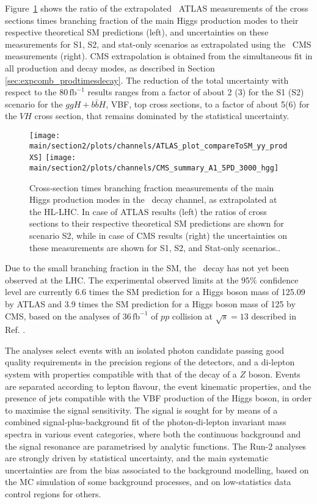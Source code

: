 Figure~\ref{fig:Hyy_ATLAS_HLLHC_S2} shows the ratio of the extrapolated \Hyy\ ATLAS measurements of the cross sections times branching fraction of the main Higgs production modes to their respective theoretical SM predictions (left), and uncertainties on these measurements for S1, S2, and stat-only scenarios as extrapolated using the \Hyy\ CMS measurements (right). CMS extrapolation is obtained from the simultaneous fit in all production and decay modes, as described in Section \ref{sec:expcomb_prodtimesdecay}. The reduction of the total uncertainty with respect to the 80\,$\mathrm{fb}^{-1}$ results ranges from a factor of about 2 (3) for the S1 (S2) scenario for the $ggH+b\bar{b}H$, VBF, top cross sections, to a factor of about 5(6) for the $VH$ cross section, that remains dominated by the statistical uncertainty.

\begin{figure}
  \centering
  \texttt{[image: \\main/section2/plots/channels/ATLAS\_plot\_compareToSM\_yy\_prodXS]}
  \texttt{[image: \\main/section2/plots/channels/CMS\_summary\_A1\_5PD\_3000\_hgg]}
  \caption{Cross-section times branching fraction measurements of the main Higgs production modes in the \Hyy\ decay channel, as extrapolated at the HL-LHC. In case of ATLAS results (left) the ratios of cross sections to their respective theoretical SM predictions are shown for scenario S2, while in case of CMS results (right) the uncertainties on these measurements are shown for S1, S2, and Stat-only scenarios..}
  \label{fig:Hyy_ATLAS_HLLHC_S2}
\end{figure}


Due to the small branching fraction in the SM, the \HZy\ decay has not yet been observed at the LHC. The experimental observed limits at the $95\%$ confidence level are currently 6.6 times the SM prediction for a Higgs boson mass of 125.09 \UGeV by ATLAS and 3.9 times the SM prediction for a Higgs boson mass of 125 \UGeV by CMS, based on the analyses of 36\,$\mathrm{fb}^{-1}$ of $pp$ collision at $\sqrt{s} = 13$ \UTeV described in Ref. \cite{Aaboud:2017uhw, Sirunyan:2018tbk}.

The analyses select events with an isolated photon candidate passing good quality requirements in the precision regions of the detectors, and a di-lepton system with properties compatible with that of the decay of a $Z$ boson. Events are separated according to lepton flavour, the event kinematic properties, and the presence of jets compatible with the VBF production of the Higgs boson, in order to maximise the signal sensitivity. The signal is sought for by means of a combined signal-plus-background fit of the photon-di-lepton invariant mass spectra in various event categories, where both the continuous background and the signal resonance are parametrised by analytic functions. The Run-2 analyses are strongly driven by statistical uncertainty, and the main systematic uncertainties are from the bias associated to the background modelling, based on the MC simulation of some background processes, and on low-statistics data control regions for others.

